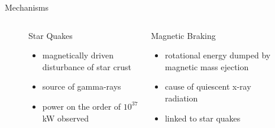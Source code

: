 \documentclass[hyperref=pdftex, presentation]{beamer}
\begin{document}
\begin{frame}{\Large Mechanisms}
	\begin{figure}
		\begin{columns}[c] %
			
			\begin{block}{Star Quakes}
				\begin{itemize}
 					\item<2-> magnetically driven disturbance of star crust
 					\item<3-> source of gamma-rays
 					\item<4-> power on the order of $10^{37}$ kW observed %
				\end{itemize}
			\end{block}
			
			\begin{block}{Magnetic Braking}
				\begin{itemize}
 					\item<5-> rotational energy dumped by magnetic mass ejection
 					\item<6-> cause of quiescent x-ray radiation
 					\item<7-> linked to star quakes
				\end{itemize}
			\end{block}

		\end{columns}
	\end{figure}
\end{frame}
\end{document}
